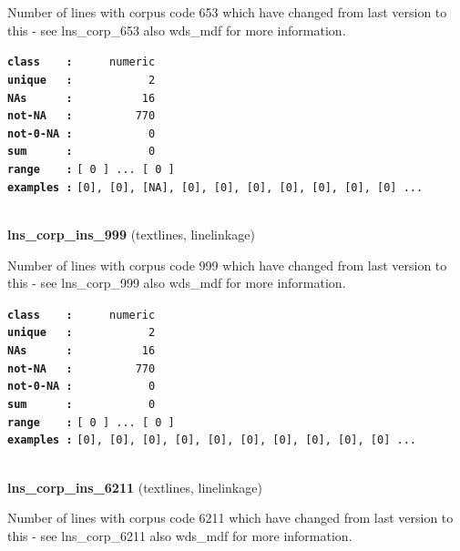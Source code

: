 \documentclass[]{article}
\begin{document}
Number of lines with corpus code 653 which have changed from last
version to this - see lns\_corp\_653 also wds\_mdf for more information.

\textbf{\texttt{class\ \ \ \ :}} \texttt{~~~~~numeric}\\
\textbf{\texttt{unique\ \ \ :}} \texttt{~~~~~~~~~~~2}\\
\textbf{\texttt{NAs\ \ \ \ \ \ :}} \texttt{~~~~~~~~~~16}\\
\textbf{\texttt{not-NA\ \ \ :}} \texttt{~~~~~~~~~770}\\
\textbf{\texttt{not-0-NA\ :}} \texttt{~~~~~~~~~~~0}\\
\textbf{\texttt{sum\ \ \ \ \ \ :}} \texttt{~~~~~~~~~~~0}\\
\textbf{\texttt{range\ \ \ \ :}}
\texttt{{[}\ 0\ {]}\ ...\ {[}\ 0\ {]}}\\
\textbf{\texttt{examples\ :}}
\texttt{{[}0{]},\ {[}0{]},\ {[}NA{]},\ {[}0{]},\ {[}0{]},\ {[}0{]},\ {[}0{]},\ {[}0{]},\ {[}0{]},\ {[}0{]}\ ...}\\

~

\textbf{lns\_corp\_ins\_999} (textlines, linelinkage)

Number of lines with corpus code 999 which have changed from last
version to this - see lns\_corp\_999 also wds\_mdf for more information.

\textbf{\texttt{class\ \ \ \ :}} \texttt{~~~~~numeric}\\
\textbf{\texttt{unique\ \ \ :}} \texttt{~~~~~~~~~~~2}\\
\textbf{\texttt{NAs\ \ \ \ \ \ :}} \texttt{~~~~~~~~~~16}\\
\textbf{\texttt{not-NA\ \ \ :}} \texttt{~~~~~~~~~770}\\
\textbf{\texttt{not-0-NA\ :}} \texttt{~~~~~~~~~~~0}\\
\textbf{\texttt{sum\ \ \ \ \ \ :}} \texttt{~~~~~~~~~~~0}\\
\textbf{\texttt{range\ \ \ \ :}}
\texttt{{[}\ 0\ {]}\ ...\ {[}\ 0\ {]}}\\
\textbf{\texttt{examples\ :}}
\texttt{{[}0{]},\ {[}0{]},\ {[}0{]},\ {[}0{]},\ {[}0{]},\ {[}0{]},\ {[}0{]},\ {[}0{]},\ {[}0{]},\ {[}0{]}\ ...}\\

~

\textbf{lns\_corp\_ins\_6211} (textlines, linelinkage)

Number of lines with corpus code 6211 which have changed from last
version to this - see lns\_corp\_6211 also wds\_mdf for more
information.
\end{document}
